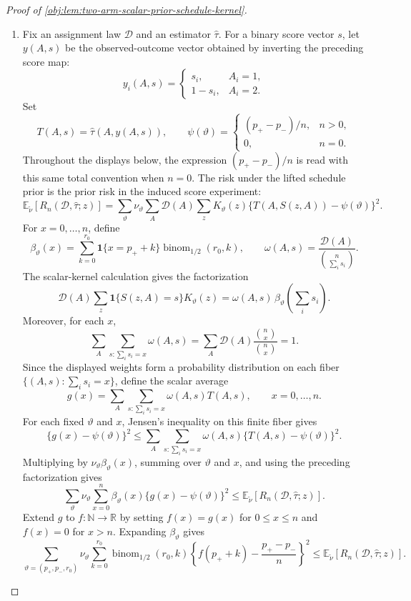 \documentclass[11pt]{article}
\begin{document}
\begin{proof}[Proof of \cref{obj:lem:two-arm-scalar-prior-schedule-kernel}]
\begin{enumerate}
\item Fix an assignment law \(\mathcal D\) and an estimator \(\widehat\tau\).  For a binary score vector \(s\), let \(y(A,s)\) be the observed-outcome vector obtained by inverting the preceding score map:
\[
y_i(A,s)=
\begin{cases}
s_i,&A_i=1,\\
1-s_i,&A_i=2.
\end{cases}
\]
Set
\[
T(A,s)=\widehat\tau(A,y(A,s)),
\qquad
\psi(\vartheta)=
\begin{cases}
(p_+-p_-)/n,& n>0,\\
0,& n=0.
\end{cases}
\]
Throughout the displays below, the expression \((p_+-p_-)/n\) is read with this same total convention when \(n=0\).  The risk under the lifted schedule prior is the prior risk in the induced score experiment:
\[
\mathbb E_{\widetilde\nu}\!\left[R_n(\mathcal D,\widehat\tau;z)\right]
=
\sum_\vartheta \nu_\vartheta
\sum_A \mathcal D(A)
\sum_z K_\vartheta(z)\{T(A,S(z,A))-\psi(\vartheta)\}^2 .
\]
For \(x=0,\ldots,n\), define
\[
\beta_\vartheta(x)=
\sum_{k=0}^{r_0}\mathbf 1\{x=p_+ + k\}\operatorname{binom}_{1/2}(r_0,k),
\qquad
\omega(A,s)=\frac{\mathcal D(A)}{\binom n{\sum_i s_i}}.
\]
The scalar-kernel calculation gives the factorization
\[
\mathcal D(A)
\sum_z \mathbf 1\{S(z,A)=s\}K_\vartheta(z)
=
\omega(A,s)\,\beta_\vartheta\!\left(\sum_i s_i\right).
\]
Moreover, for each \(x\),
\[
\sum_{A}\sum_{s:\sum_i s_i=x}\omega(A,s)
=
\sum_A\mathcal D(A)\frac{\binom n x}{\binom n x}
=
1.
\]
Since the displayed weights form a probability distribution on each fiber \(\{(A,s):\sum_i s_i=x\}\), define the scalar average
\[
g(x)=
\sum_A\sum_{s:\sum_i s_i=x}
\omega(A,s)T(A,s),
\qquad x=0,\ldots,n .
\]
For each fixed \(\vartheta\) and \(x\), Jensen's inequality on this finite fiber gives
\[
\{g(x)-\psi(\vartheta)\}^2
\le
\sum_A\sum_{s:\sum_i s_i=x}
\omega(A,s)\{T(A,s)-\psi(\vartheta)\}^2 .
\]
Multiplying by \(\nu_\vartheta\beta_\vartheta(x)\), summing over \(\vartheta\) and \(x\), and using the preceding factorization gives
\[
\sum_\vartheta\nu_\vartheta
\sum_{x=0}^n
\beta_\vartheta(x)\{g(x)-\psi(\vartheta)\}^2
\le
\mathbb E_{\widetilde\nu}\!\left[R_n(\mathcal D,\widehat\tau;z)\right].
\]  Extend \(g\) to \(f:\mathbb N\to\mathbb R\) by setting \(f(x)=g(x)\) for \(0\le x\le n\) and \(f(x)=0\) for \(x>n\).  Expanding \(\beta_\vartheta\) gives
\[
\sum_{\vartheta=(p_+,p_-,r_0)}
\nu_\vartheta
\sum_{k=0}^{r_0}
\operatorname{binom}_{1/2}(r_0,k)
\left\{
f(p_+ + k)-\frac{p_+-p_-}{n}
\right\}^2
\le
\mathbb E_{\widetilde\nu}\!\left[
R_n(\mathcal D,\widehat\tau;z)
\right].
\] %


\end{enumerate}
\end{proof}
\end{document}
